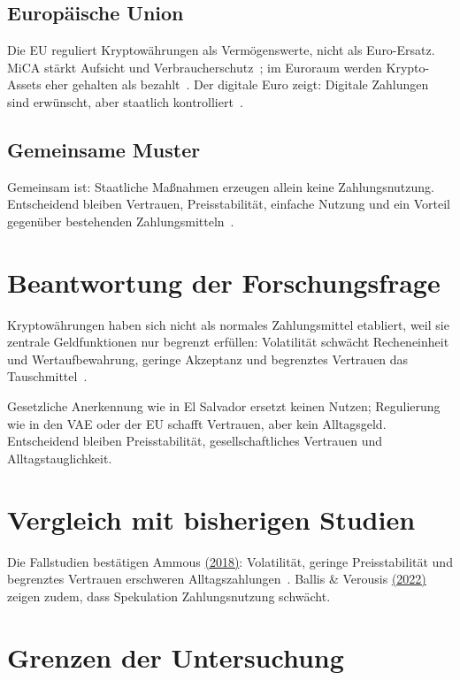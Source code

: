 \subsection{Europäische Union}
Die EU reguliert Kryptowährungen als Vermögenswerte, nicht als Euro-Ersatz. MiCA stärkt Aufsicht und Verbraucherschutz~\cite{MiCA2023}; im Euroraum werden Krypto-Assets eher gehalten als bezahlt~\cite{Zamora2026}. Der digitale Euro zeigt: Digitale Zahlungen sind erwünscht, aber staatlich kontrolliert~\cite{ECB2025}.

\subsection{Gemeinsame Muster}

Gemeinsam ist: Staatliche Maßnahmen erzeugen allein keine Zahlungsnutzung. Entscheidend bleiben Vertrauen, Preisstabilität, einfache Nutzung und ein Vorteil gegenüber bestehenden Zahlungsmitteln~\cite{Ammous2018}.

\section{Beantwortung der Forschungsfrage}

Kryptowährungen haben sich nicht als normales Zahlungsmittel etabliert, weil sie zentrale Geldfunktionen nur begrenzt erfüllen: Volatilität schwächt Recheneinheit und Wertaufbewahrung, geringe Akzeptanz und begrenztes Vertrauen das Tauschmittel~\cite{Ammous2018, Ballis2022}.

Gesetzliche Anerkennung wie in El Salvador ersetzt keinen Nutzen; Regulierung wie in den VAE oder der EU schafft Vertrauen, aber kein Alltagsgeld. Entscheidend bleiben Preisstabilität, gesellschaftliches Vertrauen und Alltagstauglichkeit.

\section{Vergleich mit bisherigen Studien}
Die Fallstudien bestätigen Ammous \hyperref[Ammous2018]{(2018)}: Volatilität, geringe Preisstabilität und begrenztes Vertrauen erschweren Alltagszahlungen~\cite{Ammous2018}. Ballis \& Verousis \hyperref[Ballis2022]{(2022)} zeigen zudem, dass Spekulation Zahlungsnutzung schwächt.

\section{Grenzen der Untersuchung}

